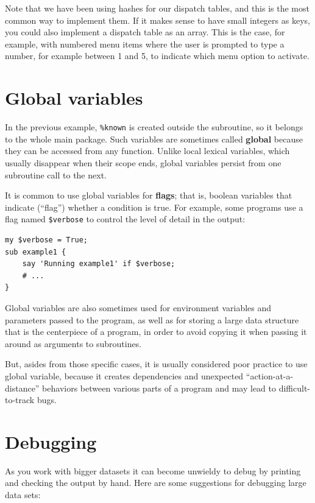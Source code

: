 Note that we have been using hashes for our dispatch tables, 
and this is the most common way to implement them. If it 
makes sense to have small integers as keys, you could also 
implement a dispatch table as an array. This is the case, 
for example, with numbered menu items where the user is 
prompted to type a number, for example between 1 and 5, to 
indicate which menu option to activate.


\section{Global variables}

In the previous example, \verb'%known' is created outside the subroutine,
so it belongs to the whole main package.
Such variables are sometimes called {\bf global} 
because they can be accessed from any function.  Unlike local
lexical variables, which usually disappear when their scope 
ends, global variables persist from one subroutine call to 
the next.

It is common to use global variables for {\bf flags}; that is, 
boolean variables that indicate (``flag'') whether a condition
is true.  For example, some programs use a flag named 
\verb'$verbose' to control the level of detail in the
output:

\begin{verbatim}
my $verbose = True;
sub example1 {
    say 'Running example1' if $verbose;
    # ...
}
\end{verbatim}
%

Global variables are also sometimes used for environment 
variables and parameters passed to the program, as well
as for storing a large 
data structure that is the centerpiece of a program, in order 
to avoid copying it when passing it around as arguments to 
subroutines.

But, asides from those specific cases, it is usually 
considered poor practice to use global variable, because 
it creates dependencies and unexpected ``action-at-a-distance'' 
behaviors between various parts of a program and may lead to 
difficult-to-track bugs.


\section{Debugging}

As you work with bigger datasets it can become unwieldy to
debug by printing and checking the output by hand.  Here are some
suggestions for debugging large data sets:

